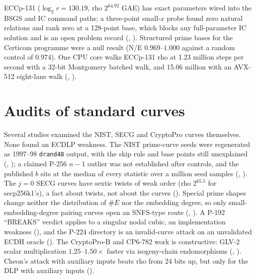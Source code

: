 ECCp-131 ($\log_2 r=130.19$, rho $2^{64.92}$ GAE) has exact parameters wired
into the BSGS and IC command paths; a three-point small-$x$ probe found zero
natural relations and rank zero at a 128-point base, which blocks any
full-parameter IC solution and is an open problem record
(,
). Structured prime
bases for the Certicom programme were a null result (N/E $0.969$--$1.000$
against a random control of $0.974$). One CPU core walks ECCp-131 rho at
1.23 million steps per second with a 32-bit Montgomery batched walk, and
15.06 million with an AVX-512 eight-lane walk
(,
).

\section{Audits of standard curves}

Several studies examined the NIST, SECG and CryptoPro curves themselves.
None found an ECDLP weakness. The NIST prime-curve seeds were regenerated as
1997--98 \texttt{drand48} output, with the skip rule and base points still
unexplained (,
); a claimed P-256 $n-1$
outlier was not established after controls, and the published $b$ sits at the
median of every statistic over a million seed samples
(,
). The $j=0$ SECG curves have
sextic twists of weak order (rho $2^{65.5}$ for secp256k1's), a fact about
twists, not about the curves ().
Special prime shapes change neither the distribution of $\#E$ nor the
embedding degree, so only small-embedding-degree pairing curves open an
SNFS-type route (,
). A P-192 ``BREAKS'' verdict
applies to a singular nodal cubic, an implementation weakness
(), and the P-224 directory is an
invalid-curve attack on an unvalidated ECDH oracle
(). The CryptoPro-B and CP6-782 work is
constructive: GLV-2 scalar multiplication $1.25$--$1.50\times$ faster via
isogeny-chain endomorphisms (,
). Cheon's attack with auxiliary
inputs beats rho from 24 bits up, but only for the DLP with auxiliary inputs
().

